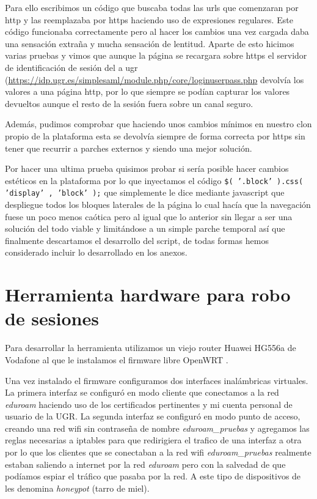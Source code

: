 \bigskip
Para ello escribimos un código que buscaba todas las urls que comenzaran por http y las reemplazaba por https haciendo uso de expresiones regulares. Este código funcionaba correctamente pero al hacer los cambios una vez cargada daba una sensación extraña y mucha sensación de lentitud. Aparte de esto hicimos varias pruebas y vimos que aunque la página se recargara sobre https el servidor de identificación de sesión del a ugr (\url{https://idp.ugr.es/simplesaml/module.php/core/loginuserpass.php} devolvía los valores a una página http, por lo que siempre se podían capturar los valores devueltos aunque el resto de la sesión fuera sobre un canal seguro. 

\bigskip
Además, pudimos comprobar que haciendo unos cambios mínimos en nuestro clon propio de la plataforma esta se devolvía siempre de forma correcta por https sin tener que recurrir a parches externos y siendo una mejor solución.

\bigskip
Por hacer una ultima prueba quisimos probar si sería posible hacer cambios estéticos en la plataforma por lo que inyectamos el código \texttt{\$( '.block' ).css( 'display' , 'block' );} que simplemente le dice mediante javascript que despliegue todos los bloques laterales de la página lo cual hacía que la navegación fuese un poco menos caótica pero al igual que lo anterior sin llegar a ser una solución del todo viable y limitándose a un simple parche temporal así que finalmente descartamos el desarrollo del script, de todas formas hemos considerado incluir lo desarrollado en los anexos.


\section{Herramienta hardware para robo de sesiones}

Para desarrollar la herramienta utilizamos un viejo router Huawei HG556a de Vodafone al que le instalamos el firmware libre OpenWRT \cite{openwrt}. 

\bigskip
Una vez instalado el firmware configuramos dos interfaces inalámbricas virtuales. La primera interfaz se configuró en modo cliente que conectamos a la red \textit{eduroam} haciendo uso de los certificados pertinentes y mi cuenta personal de usuario de la UGR. La segunda interfaz se configuró en modo punto de acceso, creando una red wifi sin contraseña de nombre \textit{eduroam\_pruebas} y agregamos las reglas necesarias a iptables para que redirigiera el trafico de una interfaz a otra por lo que los clientes que se conectaban a la red wifi \textit{eduroam\_pruebas} realmente estaban saliendo a internet por la red \textit{eduroam} pero con la salvedad de que podíamos espiar el tráfico que pasaba por la red. A este tipo de dispositivos de les denomina \textit{honeypot} (tarro de miel). 

